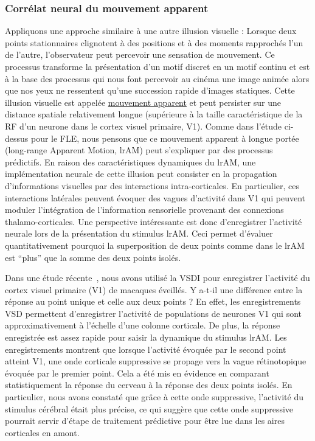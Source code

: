 \subsubsection{Corrélat neural du mouvement apparent}
Appliquons une approche similaire à une autre illusion visuelle :
Lorsque deux points stationnaires clignotent à des positions et à des
moments rapprochés l'un de l'autre, l'observateur peut percevoir une
sensation de mouvement. Ce processus transforme la présentation d'un motif
discret en un motif continu et est à la base des processus qui nous font percevoir au cinéma une image animée alors que nos yeux ne ressentent qu'une succession rapide d'images statiques.
Cette illusion visuelle est appelée
\href{https://en.wikipedia.org/wiki/Beta_movement}{mouvement apparent}
et peut persister sur une distance spatiale relativement longue (supérieure à la
taille caractéristique de la RF d'un neurone dans le cortex visuel
primaire, V1). Comme dans l'étude ci-dessus pour le FLE, nous pensons que ce
mouvement apparent à longue portée (long-range Apparent Motion, lrAM) peut s'expliquer par des
processus prédictifs. En raison des caractéristiques dynamiques du lrAM,
une implémentation neurale de cette illusion peut consister en la
propagation d'informations visuelles par des interactions
intra-corticales. En particulier, ces interactions latérales peuvent
évoquer des vagues d'activité dans V1 qui peuvent moduler l'intégration de
l'information sensorielle provenant des connexions thalamo-corticales.
Une perspective intéressante est donc d'enregistrer l'activité neurale
lors de la présentation du stimulus lrAM. Ceci permet d'évaluer
quantitativement pourquoi la superposition de deux points comme dans le
lrAM est ``plus'' que la somme des deux points isolés.

Dans une étude récente~\citep{Chemla19}, nous avons utilisé la VSDI
pour enregistrer l'activité du cortex visuel primaire (V1) de macaques
éveillés. Y a-t-il une différence entre la réponse au point unique et
celle aux deux points ? En effet, les enregistrements VSD permettent
d'enregistrer l'activité de populations de neurones V1 qui sont
approximativement à l'échelle d'une colonne corticale. De plus, la
réponse enregistrée est assez rapide pour saisir la dynamique du
stimulus lrAM. Les enregistrements montrent que lorsque l'activité
évoquée par le second point atteint V1, une onde corticale suppressive se
propage vers la vague rétinotopique évoquée par le premier point. Cela a
été mis en évidence en comparant statistiquement la réponse du cerveau à
la réponse des deux points isolés. En particulier, nous avons constaté
que grâce à cette onde suppressive, l'activité du stimulus cérébral
était plus précise, ce qui suggère que cette onde suppressive pourrait
servir d'étape de traitement prédictive pour être lue dans les aires
corticales en amont.


